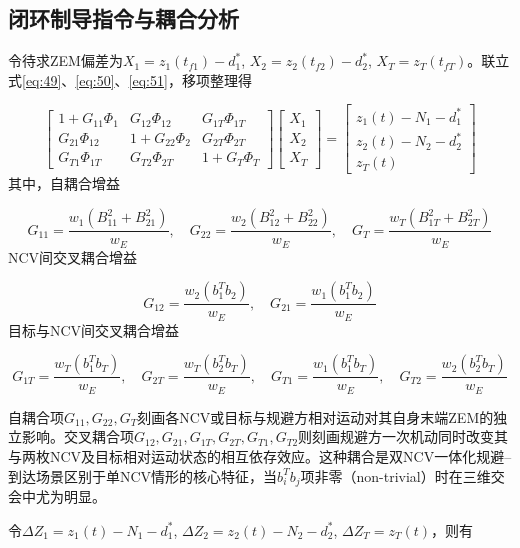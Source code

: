\subsection{闭环制导指令与耦合分析}
令待求ZEM偏差为${X_1} = {z_1}({t_{f1}}) - d_1^*$, ${X_2} = {z_2}({t_{f2}}) - d_2^*$, ${X_T} = {z_T}({t_{fT}})$。联立式\eqref{eq:49}、\eqref{eq:50}、\eqref{eq:51}，移项整理得

\begin{equation}
\label{eq:56}
\left[ {\begin{array}{*{20}{c}}
  {1 + {G_{11}}{\Phi _1}}&{{G_{12}}{\Phi _{12}}}&{{G_{1T}}{\Phi _{1T}}} \\ 
  {{G_{21}}{\Phi _{12}}}&{1 + {G_{22}}{\Phi _2}}&{{G_{2T}}{\Phi _{2T}}} \\ 
  {{G_{T1}}{\Phi _{1T}}}&{{G_{T2}}{\Phi _{2T}}}&{1 + {G_T}{\Phi _T}} 
\end{array}} \right]
\begin{bmatrix}
  {X_1} \\
  {X_2} \\
  {X_T}
\end{bmatrix}
=
\begin{bmatrix}
  {z_1}(t) - {N_1} - d_1^* \\
  {z_2}(t) - {N_2} - d_2^* \\
  {z_T}(t)
\end{bmatrix}
\end{equation}
其中，自耦合增益

\begin{equation}
\label{eq:57}
{G_{11}} = \frac{{{w_1}(B_{11}^2 + B_{21}^2)}}{{{w_E}}},\quad {G_{22}} = \frac{{{w_2}(B_{12}^2 + B_{22}^2)}}{{{w_E}}},\quad {G_T} = \frac{{{w_T}(B_{1T}^2 + B_{2T}^2)}}{{{w_E}}}
\end{equation}
NCV间交叉耦合增益

\begin{equation}
\label{eq:58}
{G_{12}} = \frac{{{w_2}(b_1^T{b_2})}}{{{w_E}}},\quad {G_{21}} = \frac{{{w_1}(b_1^T{b_2})}}{{{w_E}}}
\end{equation}
目标与NCV间交叉耦合增益

\begin{equation}
\label{eq:59}
{G_{1T}} = \frac{{{w_T}(b_1^T{b_T})}}{{{w_E}}},\quad {G_{2T}} = \frac{{{w_T}(b_2^T{b_T})}}{{{w_E}}},\quad {G_{T1}} = \frac{{{w_1}(b_1^T{b_T})}}{{{w_E}}},\quad {G_{T2}} = \frac{{{w_2}(b_2^T{b_T})}}{{{w_E}}}
\end{equation}
\begin{remark}
自耦合项${G_{11}},{G_{22}},{G_T}$刻画各NCV或目标与规避方相对运动对其自身末端ZEM的独立影响。交叉耦合项${G_{12}},{G_{21}},{G_{1T}},{G_{2T}},{G_{T1}},{G_{T2}}$则刻画规避方一次机动同时改变其与两枚NCV及目标相对运动状态的相互依存效应。这种耦合是双NCV一体化规避–到达场景区别于单NCV情形的核心特征，当$b_i^T{b_j}$项非零（non-trivial）时在三维交会中尤为明显。
\end{remark}
令$\Delta {Z_1} = {z_1}(t) - {N_1} - d_1^*$, $\Delta {Z_2} = {z_2}(t) - {N_2} - d_2^*$, $\Delta {Z_T} = {z_T}(t)$，则有

